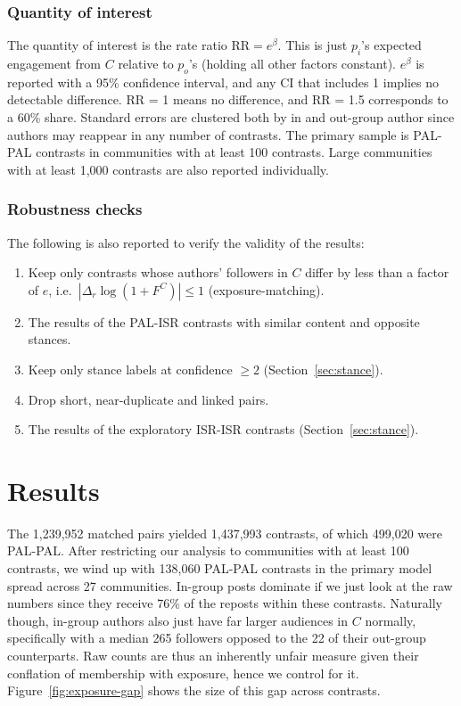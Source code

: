 \documentclass[11pt]{article}   %
\begin{document}
\subsubsection*{Quantity of interest}
The quantity of interest is the rate ratio $\text{RR} = e^{\beta}$. This is just $p_i$'s expected
engagement from $C$ relative to $p_o$'s (holding all other factors constant). $e^{\beta}$ is reported with a 95\% confidence interval, and
any CI that includes 1 implies no detectable difference. RR = 1 means no difference, and RR = 1.5 corresponds to a 60\% share. Standard errors are clustered both by in and out-group author since authors may reappear
in any number of contrasts. The primary sample is PAL-PAL contrasts in communities with at least 100 contrasts. Large communities with at least 1,000 contrasts are also reported individually. \bigskip

\subsubsection*{Robustness checks}
The following is also reported to verify the validity of the results:
\begin{enumerate}
    \item Keep only contrasts whose authors' followers in $C$ differ by less than a
    factor of $e$, i.e.\ $\left|\Delta_r \log(1 + F^{C})\right| \le 1$ (exposure-matching).
    \item The results of the PAL-ISR contrasts with similar content and opposite stances. 
    \item Keep only stance labels at confidence $\geq 2$ (Section~\ref{sec:stance}).
    \item Drop short, near-duplicate and linked pairs.
    \item The results of the exploratory ISR-ISR contrasts (Section~\ref{sec:stance}).

\end{enumerate}

\section{Results}\label{sec:results}
The 1,239,952 matched pairs yielded 1,437,993 contrasts, of which 499,020 were PAL-PAL. After restricting our analysis to communities with at least 100 contrasts, we wind up with 138,060 PAL-PAL contrasts in the primary model spread across 27 communities. 
In-group posts dominate if we just look at the raw numbers since they receive 76\% of the reposts within these
contrasts. Naturally though, in-group authors also just have far larger audiences in $C$ normally, specifically with a median 265
followers opposed to the 22 of their out-group counterparts. Raw counts are thus an inherently unfair measure given their conflation
of membership with exposure, hence we control for it.
Figure~\ref{fig:exposure-gap} shows the size of this gap across contrasts.
\end{document}

